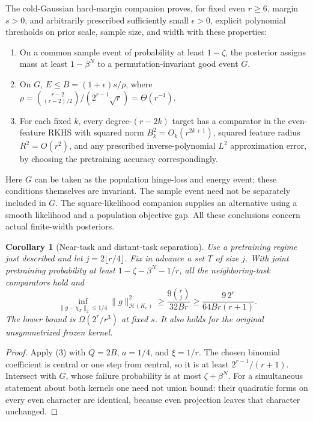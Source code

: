\documentclass[11pt]{article}
\newtheorem{corollary}[theorem]{Corollary}
\begin{document}
The cold-Gaussian hard-margin companion proves, for fixed even $r\ge6$,
margin $s>0$, and arbitrarily prescribed sufficiently small
$\epsilon>0$, explicit polynomial thresholds on prior scale, sample
size, and width with these properties:
\begin{enumerate}
\item On a common sample event of probability at least $1-\zeta$,
      the posterior assigns mass at least $1-\beta^N$ to a
      permutation-invariant good event $G$.
\item On $G$, $E\le B=(1+\epsilon)s/\rho$, where
      $\rho=\binom{r-2}{(r-2)/2}/(2^{r-1}\sqrt r)=\Theta(r^{-1})$.
\item For each fixed $k$, every degree-$(r-2k)$ target has a comparator
      in the even-feature RKHS with squared norm
      $B_k^2=O_k(r^{2k+1})$, squared feature radius $R^2=O(r^2)$,
      and any prescribed inverse-polynomial $L^2$ approximation error,
      by choosing the pretraining accuracy correspondingly.
\end{enumerate}
Here $G$ can be taken as the population hinge-loss and energy event;
these conditions themselves are invariant. The sample event need not
be separately included in $G$. The square-likelihood companion supplies
an alternative using a smooth likelihood and a population objective gap.
All these conclusions concern actual finite-width posteriors.

\begin{corollary}[Near-task and distant-task separation]\label{cor:separation}
Use a pretraining regime just described and let
$j=2\lfloor r/4\rfloor$. Fix in advance a set $T$ of size $j$.
With joint pretraining probability at least
$1-\zeta-\beta^N-1/r$, all the neighboring-task comparators hold and
\[
 \inf_{\|g-\chi_T\|_2\le1/4}\|g\|_{\mathcal H(K_e)}^2
               \ge\frac{9\binom rj}{32Br}
               \ge\frac{9\,2^r}{64Br(r+1)}.            \tag{5}
\]
The lower bound is $\Omega(2^r/r^3)$ at fixed $s$. It also holds
for the original unsymmetrized frozen kernel.
\end{corollary}
\begin{proof}
Apply (3) with $Q=2B$, $a=1/4$, and $\xi=1/r$.
The chosen binomial coefficient is central or one step from central,
so it is at least $2^{r-1}/(r+1)$.
Intersect with $G$, whose failure probability is at most
$\zeta+\beta^N$.
For a simultaneous statement about both kernels one need not union
bound: their quadratic forms on every even character are identical,
because even projection leaves that character unchanged.
\end{proof}
\end{document}

